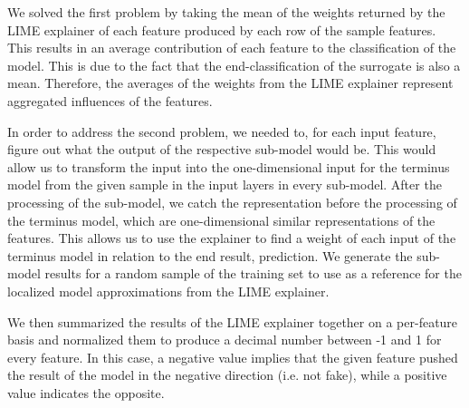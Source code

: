 \documentclass{article}
\begin{document}
We solved the first problem by taking the mean of the weights returned by the LIME explainer of each feature produced by each row of the sample features. This results in an average contribution of each feature to the classification of the model. This is due to the fact that the end-classification of the surrogate is also a mean. Therefore, the averages of the weights from the LIME explainer represent aggregated influences of the features.

In order to address the second problem, we needed to, for each input feature, figure out what the output of the respective sub-model would be. This would allow us to transform the input into the one-dimensional input for the terminus model from the given sample in the input layers in every sub-model. After the processing of the sub-model, we catch the representation before the processing of the terminus model, which are one-dimensional similar representations of the features. This allows us to use the explainer to find a weight of each input of the terminus model in relation to the end result, prediction. We generate the sub-model results for a random sample of the training set to use as a reference for the localized model approximations from the LIME explainer.

            
We then summarized the results of the LIME explainer together on a per-feature basis and normalized them to produce a decimal number between -1 and 1 for every feature. In this case, a negative value implies that the given feature pushed the result of the model in the negative direction (i.e. not fake), while a positive value indicates the opposite.
			
            
\end{document}
